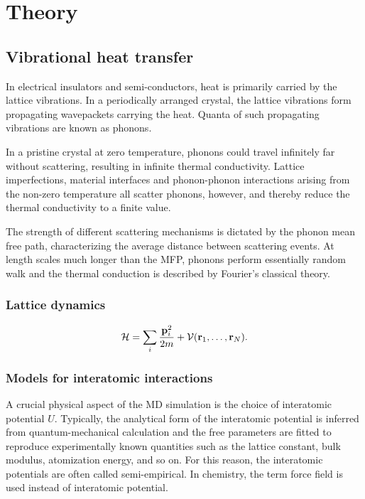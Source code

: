 \chapter{Theory}

\section{Vibrational heat transfer}

In electrical insulators and semi-conductors, heat is primarily carried by the lattice vibrations. In a periodically arranged crystal, the lattice vibrations form propagating wavepackets carrying the heat. Quanta of such propagating vibrations are known as phonons. 

In a pristine crystal at zero temperature, phonons could travel infinitely far without scattering, resulting in infinite thermal conductivity. Lattice imperfections, material interfaces and phonon-phonon interactions arising from the non-zero temperature all scatter phonons, however, and thereby reduce the thermal conductivity to a finite value. 

The strength of different scattering mechanisms is dictated by the phonon mean free path, characterizing the average distance between scattering events. At length scales much longer than the MFP, phonons perform essentially random walk and the thermal conduction is described by Fourier's classical theory. 

\subsection{Lattice dynamics}

\begin{equation}
 \mathcal{H} = \sum_{i} \frac{\mathbf{p}_i^2}{2m} + \mathcal{V}(\mathbf{r}_1,\dots,\mathbf{r}_N).
\end{equation}


\subsection{Models for interatomic interactions}

A crucial physical aspect of the MD simulation is the choice of interatomic potential $U$. Typically, the analytical form of the interatomic potential is inferred from quantum-mechanical calculation and the free parameters are fitted to reproduce experimentally known quantities such as the lattice constant, bulk modulus, atomization energy, and so on. For this reason, the interatomic potentials are often called semi-empirical. In chemistry, the term force field is used instead of interatomic potential.

